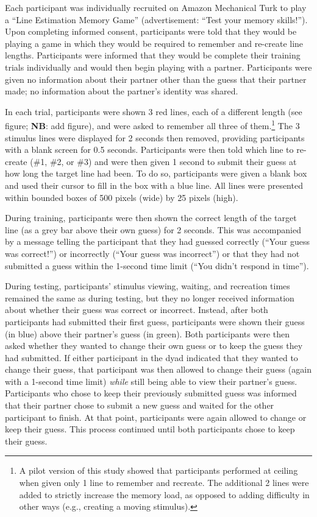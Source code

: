 \documentclass[10pt, letterpaper]{article}
\begin{document}
Each participant was individually recruited on Amazon Mechanical Turk to
play a ``Line Estimation Memory Game'' (advertisement: ``Test your
memory skills!''). Upon completing informed consent, participants were
told that they would be playing a game in which they would be required
to remember and re-create line lengths. Participants were informed that
they would be complete their training trials individually and would then
begin playing with a partner. Participants were given no information
about their partner other than the guess that their partner made; no
information about the partner's identity was shared.

In each trial, participants were shown 3 red lines, each of a different
length (see figure; \textbf{NB}: add figure), and were asked to remember
all three of
them.\footnote{A pilot version of this study showed that participants performed at ceiling when given only 1 line to remember and recreate. The additional 2 lines were added to strictly increase the memory load, as opposed to adding difficulty in other ways (e.g., creating a moving stimulus).}
The 3 stimulus lines were displayed for 2 seconds then removed,
providing participants with a blank screen for 0.5 seconds. Participants
were then told which line to re-create (\#1, \#2, or \#3) and were then
given 1 second to submit their guess at how long the target line had
been. To do so, participants were given a blank box and used their
cursor to fill in the box with a blue line. All lines were presented
within bounded boxes of 500 pixels (wide) by 25 pixels (high).

During training, participants were then shown the correct length of the
target line (as a grey bar above their own guess) for 2 seconds. This
was accompanied by a message telling the participant that they had
guessed correctly (``Your guess was correct!'') or incorrectly (``Your
guess was incorrect'') or that they had not submitted a guess within the
1-second time limit (``You didn't respond in time'').

During testing, participants' stimulus viewing, waiting, and recreation
times remained the same as during testing, but they no longer received
information about whether their guess was correct or incorrect. Instead,
after both participants had submitted their first guess, participants
were shown their guess (in blue) above their partner's guess (in green).
Both participants were then asked whether they wanted to change their
own guess or to keep the guess they had submitted. If either participant
in the dyad indicated that they wanted to change their guess, that
participant was then allowed to change their guess (again with a
1-second time limit) \emph{while} still being able to view their
partner's guess. Participants who chose to keep their previously
submitted guess was informed that their partner chose to submit a new
guess and waited for the other participant to finish. At that point,
participants were again allowed to change or keep their guess. This
process continued until both participants chose to keep their guess.
\end{document}
